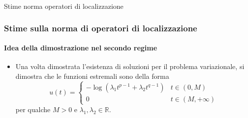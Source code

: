 \documentclass[aspectratio=141]{beamer}
\newcommand{\R}{\mathbb{R}} %
\newcommand{\emptyline}{\phantom{ }\\}
\begin{document}
\begin{section}{Stime norma operatori di localizzazione}
	\begin{frame}
		\frametitle{Stime sulla norma di operatori di localizzazione}
		\framesubtitle{Idea della dimostrazione nel secondo regime}
		\begin{itemize}
			\item Una volta dimostrata l'esistenza di soluzioni per il problema variazionale, si dimostra che le funzioni estremali sono della forma
			\begin{equation*}\label{expression u}
				u(t) = \begin{cases}
					-\log\left(\lambda_1 t^{p-1} + \lambda_2 t^{q-1}\right) & t \in (0,M)\\
					0 & t \in (M,+\infty)
				\end{cases}
			\end{equation*}
			per qualche $M>0$ e $\lambda_1, \lambda_2 \in \R$.
		\end{itemize}
		\begin{columns}[onlytextwidth,T]
			\begin{column}{.45\linewidth}
				\begin{figure}
				\end{figure}
			\end{column}
			\begin{column}{.45\linewidth}
				\emptyline
				\emptyline
				\emptyline
				\emptyline
				\begin{flushleft}
				\end{flushleft}				
			\end{column}
		\end{columns}
		\begin{center}
			
		\end{center}
	\end{frame}


\end{section}
\end{document}
